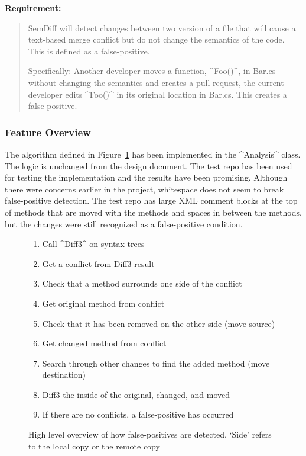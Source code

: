 \documentclass[draftclsnofoot,onecolumn]{IEEEtran}
\begin{document}
\textbf{Requirement:}

\begin{quote}

SemDiff will detect changes between two version of a file that will cause a text-based merge conflict but do not change the semantics of the code. This is defined as a false-positive. 

Specifically: Another developer moves a function, ^Foo()^, in Bar.cs without changing the semantics and creates a pull request, the current developer edits ^Foo()^ in its original location in Bar.cs. This creates a false-positive.

\end{quote}

\subsubsection{Feature Overview}

The algorithm defined in Figure~\ref{fpalgore} has been implemented in the ^Analysis^ class. The logic is unchanged from the design document. The test repo has been used for testing the implementation and the results have been promising. Although there were concerns earlier in the project, whitespace 
does not seem to break false-positive detection. The test repo has large XML comment blocks at the top of methods that are moved with the methods and spaces in between the methods, but the changes were still recognized as a false-positive condition.


\begin{figure}[h]
\centering
\begin{enumerate}
    \item Call ^Diff3^ on syntax trees
    \item Get a conflict from Diff3 result
    \item Check that a method surrounds one side of the conflict
    \item Get original method from conflict
    \item Check that it has been removed on the other side (move source)
    \item Get changed method from conflict
    \item Search through other changes to find the added method (move 
destination)
    \item Diff3 the inside of the original, changed, and moved
    \item If there are no conflicts, a false-positive has occurred
\end{enumerate}
\caption{High level overview of how false-positives are detected. `Side' 
refers to the local copy or the remote copy}
\label{fpalgore}
\end{figure}
\end{document}
